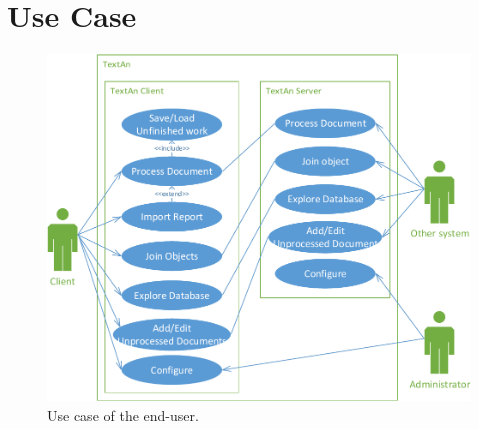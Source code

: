 \section{Use Case}

\begin{figure}[!htb]
        \centering
        \includegraphics[width=(0.9\textwidth)]{Images/UseCase}
        \caption{Use case of the end-user.}
        \label{fig:UseCase}
\end{figure}

